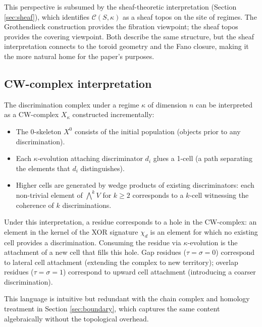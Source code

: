 This perspective is subsumed by the sheaf-theoretic
interpretation (Section \ref{sec:sheaf}), which
identifies $\mathcal{C}(S,\kappa)$ as a sheaf topos on
the site of regimes. The Grothendieck construction
provides the fibration viewpoint; the sheaf topos
provides the covering viewpoint. Both describe the same
structure, but the sheaf interpretation connects to the
toroid geometry and the Fano closure, making it the more
natural home for the paper's purposes.

\subsection{CW-complex interpretation}

The discrimination complex under a regime $\kappa$ of
dimension $n$ can be interpreted as a CW-complex
$X_\kappa$ constructed incrementally:
\begin{itemize}[nosep]
  \item The 0-skeleton $X^0$ consists of the initial
    population (objects prior to any discrimination).
  \item Each $\kappa$-evolution attaching discriminator
    $d_i$ glues a 1-cell (a path separating the elements
    that $d_i$ distinguishes).
  \item Higher cells are generated by wedge products of
    existing discriminators: each non-trivial element of
    $\bigwedge^k V$ for $k \geq 2$ corresponds to a
    $k$-cell witnessing the coherence of $k$
    discriminations.
\end{itemize}

Under this interpretation, a residue corresponds to a
hole in the CW-complex: an element in the kernel of the
XOR signature $\chi_d$ is an element for which no
existing cell provides a discrimination. Consuming the
residue via $\kappa$-evolution is the attachment of a new
cell that fills this hole. Gap residues
($\tau = \sigma = 0$) correspond to lateral cell
attachment (extending the complex to new territory);
overlap residues ($\tau = \sigma = 1$) correspond to
upward cell attachment (introducing a coarser
discrimination).

This language is intuitive but redundant with the chain
complex and homology treatment in Section \ref{sec:boundary},
which captures the same content algebraically without
the topological overhead.

